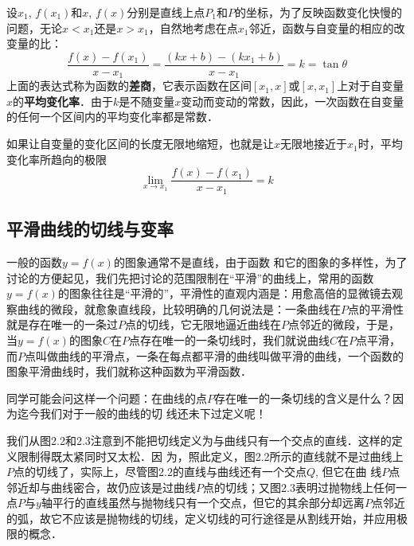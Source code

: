 设$x_1$, $f(x_1)$和$x$, $f(x)$分别是直线上点$P_1$和$P$的坐标，为了反映函数变化快慢的问题，无论$x<x_1$还是$x>x_1$，自然地考虑在点$x_1$邻近，函数与自变量的相应的改变量的比：
\[\frac{f(x)-f(x_1)}{x-x_1}=\frac{(kx+b)-(kx_1+b)}{x-x_1}=k=\tan\theta\]
上面的表达式称为函数的\textbf{差商}，它表示函数在区间$[x_1,x]$或$[x,x_1]$上对于自变量$x$的\textbf{平均变化率}．由于$k$是不随变量$x$变动而变动的常数，因此，一次函数在自变量的任何一个区间内的平均变化率都是常数．

如果让自变量的变化区间的长度无限地缩短，也就是让$x$无限地接近于$x_1$时，平均变化率所趋向的极限
\[\lim_{x\to x_1} \frac{f (x) -f (x_1)}{x-x_1} =k\]

\subsection{平滑曲线的切线与变率}
一般的函数$y=f(x)$的图象通常不是直线，由于函数
和它的图象的多样性，为了讨论的方便起见，我们先把讨论的范围限制在“平滑”的曲线上，常用的函数$y=f(x)$的图象往往是“平滑的”，平滑性的直观内涵是：用愈高倍的显微镜去观察曲线的微段，就愈象直线段，比较明确的几何说法是：一条曲线在$P$点的平滑性就是存在唯一的一条过$P$点的切线，它无限地逼近曲线在$P$点邻近的微段，于是，当$y=f(x)$的图象$C$在$P$点存在唯一的一条切线时，我们就说曲线$C$在$P$点平滑，而$P$点叫做曲线的平滑点，一条在每点都平滑的曲线叫做平滑的曲线，一个函数的图象平滑曲线时，我们就称这种函数为平滑函数．

同学可能会问这样一个问题：在曲线的点$P$存在唯一的一条切线的含义是什么？因为迄今我们对于一般的曲线的切
线还未下过定义呢！

我们从图2.2和2.3注意到不能把切线定义为与曲线只有一个交点的直线．这样的定义限制得既太紧同时又太松．因
为，照此定义，图2.2所示的直线就不是过曲线上$P$点的切线了，实际上，尽管图2.2的直线与曲线还有一个交点$Q$, 但它在曲
线$P$点邻近却与曲线密合，故仍应该是过曲线$P$点的切线；又图2.3表明过抛物线上任何一点$P$与$y$轴平行的直线虽然与抛物线只有一个交点，但它的其余部分却远离$P$点邻近的弧，故它不应该是抛物线的切线，定义切线的可行途径是从割线开始，并应用极限的概念．

